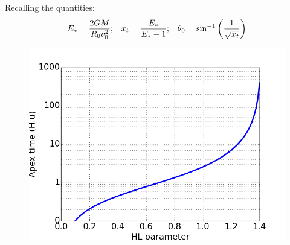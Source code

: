 Recalling the quantities:
\begin{align}
E_\ast = \frac{2GM}{R_0 v_0^2}        &;  & x_t=\frac{E_\ast}{E_\ast-1}  &;  &\theta_0 = \sin^{-1}\left(\frac{1}{\sqrt{x_t}}\right)  
\end{align}



\begin{figure}
\label{Fig:apextime}
\center
\includegraphics[width=0.7\linewidth]{Figures/1_apextime.png}
\caption{}
\end{figure} 











